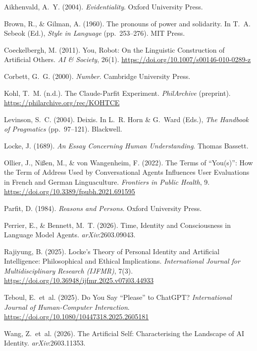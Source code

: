 \documentclass[12pt,a4paper]{article}
\begin{document}
\begin{description}
  \item Aikhenvald, A.~Y. (2004). \textit{Evidentiality}. Oxford University Press.
  \item Brown, R., \& Gilman, A. (1960). The pronouns of power and solidarity. In T.~A. Sebeok (Ed.), \textit{Style in Language} (pp.~253--276). MIT Press.
  \item Coeckelbergh, M. (2011). You, Robot: On the Linguistic Construction of Artificial Others. \textit{AI \& Society}, 26(1). \url{https://doi.org/10.1007/s00146-010-0289-z}
  \item Corbett, G.~G. (2000). \textit{Number}. Cambridge University Press.
  \item Kohl, T.~M. (n.d.). The Claude-Parfit Experiment. \textit{PhilArchive} (preprint). \url{https://philarchive.org/rec/KOHTCE}
  \item Levinson, S.~C. (2004). Deixis. In L.~R. Horn \& G.~Ward (Eds.), \textit{The Handbook of Pragmatics} (pp.~97--121). Blackwell.
  \item Locke, J. (1689). \textit{An Essay Concerning Human Understanding}. Thomas Bassett.
  \item Ollier, J., Nißen, M., \& von Wangenheim, F. (2022). The Terms of ``You(s)'': How the Term of Address Used by Conversational Agents Influences User Evaluations in French and German Linguaculture. \textit{Frontiers in Public Health}, 9. \url{https://doi.org/10.3389/fpubh.2021.691595}
  \item Parfit, D. (1984). \textit{Reasons and Persons}. Oxford University Press.
  \item Perrier, E., \& Bennett, M.~T. (2026). Time, Identity and Consciousness in Language Model Agents. \textit{arXiv}:2603.09043.
  \item Rajiyung, B. (2025). Locke's Theory of Personal Identity and Artificial Intelligence: Philosophical and Ethical Implications. \textit{International Journal for Multidisciplinary Research (IJFMR)}, 7(3). \url{https://doi.org/10.36948/ijfmr.2025.v07i03.44933}
  \item Teboul, E.~et~al. (2025). Do You Say ``Please'' to ChatGPT? \textit{International Journal of Human-Computer Interaction}. \url{https://doi.org/10.1080/10447318.2025.2605181}
  \item Wang, Z.~et~al. (2026). The Artificial Self: Characterising the Landscape of AI Identity. \textit{arXiv}:2603.11353.
\end{description}
\end{document}
